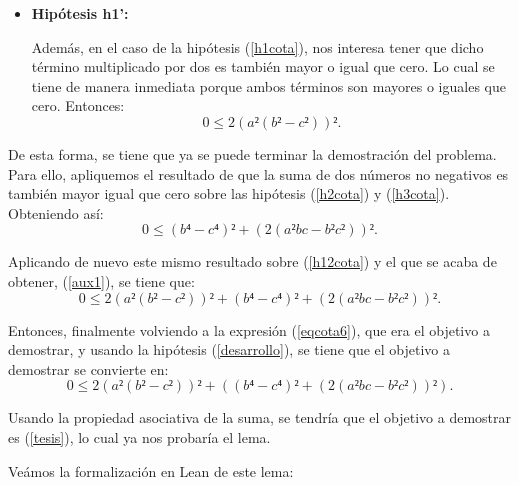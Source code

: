 \begin{demostracion}
\begin{itemize}
  \item\textbf{Hipótesis h1':}

    Además, en el caso de la hipótesis (\ref{h1cota}), nos interesa
    tener que dicho término multiplicado por dos es también mayor o igual
    que cero. Lo cual se tiene de manera inmediata porque ambos términos
    son mayores o iguales que cero. Entonces:
    \begin{equation}
      0≤2(a²(b²-c²))².\label{h12cota}\tag{h1'}
    \end{equation}                      
  \end{itemize}

  De esta forma, se tiene que ya se puede terminar la demostración del
  problema. Para ello, apliquemos el resultado de que la suma de dos
  números no negativos es también mayor igual que cero sobre las hipótesis
  (\ref{h2cota}) y (\ref{h3cota}). Obteniendo así:
  \begin{equation}\label{aux1}\tag{aux1}
    0≤(b⁴-c⁴)²+(2(a²bc-b²c²))².
  \end{equation}

  Aplicando de nuevo este mismo resultado sobre (\ref{h12cota}) y el que
  se acaba de obtener, (\ref{aux1}), se tiene que:
  \begin{equation}\label{tesis}\tag{tesis}
    0≤2(a²(b²-c²))²+(b⁴-c⁴)²+(2(a²bc-b²c²))².
  \end{equation}

  Entonces, finalmente volviendo a la expresión (\ref{eqcota6}), que era
  el objetivo a demostrar, y usando la hipótesis (\ref{desarrollo}), se
  tiene que el objetivo a demostrar se convierte en:
  \begin{equation}
    0≤2(a²(b²-c²))²+((b⁴-c⁴)²+(2(a²bc-b²c²))²).
  \end{equation}

  Usando la propiedad asociativa de la suma, se tendría que el objetivo a
  demostrar es (\ref{tesis}), lo cual ya nos probaría el lema.
\end{demostracion}

Veámos la formalización en Lean de este lema:

